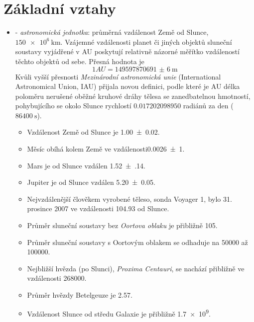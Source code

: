   \section{Základní vztahy}
    \begin{itemize}
      \item \wikiAU - \emph{astronomická jednotka}: průměrná vzdálenost Země od Slunce, 
      $\SI{150e6}{\km}$. Vzájemné vzdálenosti planet či jiných objektů sluneční soustavy 
      vy\-já\-dře\-né v AU poskytují relativně názorné měřítko vzdáleností těchto objektů od sebe. 
      Přesná hodnota je
      \begin{equation*}
        1 AU = \SI[multi-part-units = single]{149597870691(6)}{\m}
      \end{equation*}
      Kvůli vyšší přesnosti \emph{Mezinárodní astronomická unie} (International Astronomical 
      Union, IAU) přijala novou de\-fi\-ni\-ci, podle které je AU délka poloměru nerušené oběžné 
      kruhové dráhy tělesa se zanedbatelnou hmotností, pohybujícího se okolo Slunce rychlostí 
      \newline \(\num{0,017202098950}\) radiánů za den (\(\SI{86400}{\second}\)). 
        \begin{itemize}
          \item Vzdálenost Země od Slunce je \SI{1.00(2)}{\AU}.
          \item Měsíc obíhá kolem Země ve vzdálenosti\newline \SI{0,0026(1)}{\AU}.
          \item Mars je od Slunce vzdálen \SI{1.52(14)}{\AU}.
          \item Jupiter je od Slunce vzdálen \SI{5.20(5)}{\AU}.
          \item Nejvzdálenější člověkem vyrobené těleso, sonda \newline Voyager 1, bylo 31.
                prosince 2007 ve vzdálenosti \SI{104.93}{\AU} od Slunce.
          \item Průměr sluneční soustavy bez \emph{Oortova oblaku} je přibližně \SI{105}{\AU}.
          \item Průměr sluneční soustavy s Oortovým oblakem se odhaduje na \SI{50000}{\AU} až    
                \SI{100000}{\AU}.
          \item Nejbližší hvězda (po Slunci), \emph{Proxima Centauri}, se nachází přibližně ve 
                vzdálenosti \SI{268000}{\AU}.
          \item Průměr hvězdy Betelgeuze je \SI{2.57}{\AU}.
          \item Vzdálenost Slunce od středu Galaxie je přibližně \SI{1.7e9}{\AU}.

\end{itemize}
\end{itemize}
